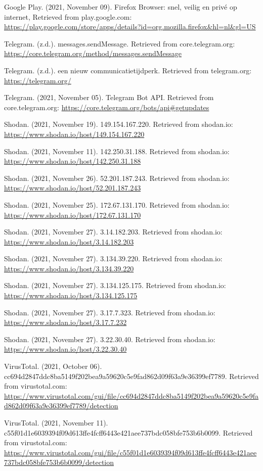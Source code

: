 Google Play. (2021, November 09).
	Firefox Browser: snel, veilig en privé op internet, Retrieved from play.google.com:
	\url{https://play.google.com/store/apps/details?id=org.mozilla.firefox&hl=nl&gl=US} 

Telegram. (z.d.).
	messages.sendMessage. Retrieved from core.telegram.org:
	\url{https://core.telegram.org/method/messages.sendMessage}

Telegram. (z.d.).
	een nieuw communicatietijdperk. Retrieved from telegram.org:
	\url{https://telegram.org/}

Telegram. (2021, November 05).
	Telegram Bot API. Retrieved from core.telegram.org:
	\url{https://core.telegram.org/bots/api#getupdates}

Shodan. (2021, November 19).
	149.154.167.220. Retrieved from shodan.io:
	\url{https://www.shodan.io/host/149.154.167.220}

Shodan. (2021, November 11).
	142.250.31.188. Retrieved from shodan.io:
	\url{https://www.shodan.io/host/142.250.31.188}

Shodan. (2021, November 26).
	52.201.187.243. Retrieved from shodan.io:
	\url{https://www.shodan.io/host/52.201.187.243}

Shodan. (2021, November 25).
	172.67.131.170. Retrieved from shodan.io:
	\url{https://www.shodan.io/host/172.67.131.170} 

Shodan. (2021, November 27).
	3.14.182.203. Retrieved from shodan.io:
	\url{https://www.shodan.io/host/3.14.182.203}  

Shodan. (2021, November 27).
	3.134.39.220. Retrieved from shodan.io:
	\url{https://www.shodan.io/host/3.134.39.220} 

Shodan. (2021, November 27).
	3.134.125.175. Retrieved from shodan.io:
	\url{https://www.shodan.io/host/3.134.125.175} 

Shodan. (2021, November 27).
	3.17.7.323. Retrieved from shodan.io:
	\url{https://www.shodan.io/host/3.17.7.232} 

Shodan. (2021, November 27).
	3.22.30.40. Retrieved from shodan.io:
	\url{https://www.shodan.io/host/3.22.30.40} 

VirusTotal. (2021, October 06).
    cc694d2847ddc8ba5149f202bea9a59620c5e9fad862d09f63a9e36399ef7789. Retrieved from virustotal.com:
    \url{https://www.virustotal.com/gui/file/cc694d2847ddc8ba5149f202bea9a59620c5e9fad862d09f63a9e36399ef7789/detection}

VirusTotal. (2021, November 11).
    c55f01d1e6039394f09d613ffe4fcff6443e421aee737bdc058bfe753b6b0099. Retrieved from virustotal.com:
    \url{https://www.virustotal.com/gui/file/c55f01d1e6039394f09d613ffe4fcff6443e421aee737bdc058bfe753b6b0099/detection}

